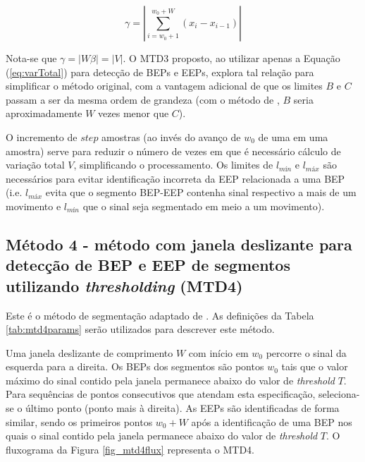 \begin{equation}
\label{eq:absVarTotal}
	\gamma = \left|\sum\limits_{i=w_0+1}^{w_0+W} (x_i - x_{i-1})\right|
\end{equation}

Nota-se que $\gamma = |W\beta| = |V|$. O MTD3 proposto, ao utilizar apenas a Equação (\ref{eq:varTotal}) para detecção de BEPs e EEPs, explora tal relação para simplificar o método original, com a vantagem adicional de que os limites $B$ e $C$ passam a ser da mesma ordem de grandeza (com o método de \cite{Gut2000}, $B$ seria aproximadamente $W$ vezes menor que $C$).

O incremento de $step$ amostras (ao invés do avanço de $w_0$ de uma em uma amostra) serve para reduzir o número de vezes em que é necessário cálculo de variação total $V$, simplificando o processamento. Os limites de $l_{mín}$ e $l_{máx}$ são necessários para evitar identificação incorreta da EEP relacionada a uma BEP (i.e. $l_{máx}$ evita que o segmento BEP-EEP contenha sinal respectivo a mais de um movimento e $l_{mín}$ que o sinal seja segmentado em meio a um movimento).

			\subsection{Método 4 - método com janela deslizante para detecção de BEP e EEP de segmentos utilizando \emph{thresholding} (MTD4)}
Este é o método de segmentação adaptado de \cite{Pattichis1995}. As definições da Tabela \ref{tab:mtd4params} serão utilizados para descrever este método.



Uma janela deslizante de comprimento $W$ com início em $w_0$ percorre o sinal da esquerda para a direita. Os BEPs dos segmentos são pontos $w_0$ tais que o valor máximo do sinal contido pela janela permanece abaixo do valor de \emph{threshold} $T$. Para sequências de pontos consecutivos que atendam esta especificação, seleciona-se o último ponto (ponto mais à direita). As EEPs são identificadas de forma similar, sendo os primeiros pontos $w_0 + W$ após a identificação de uma BEP nos quais o sinal contido pela janela permanece abaixo do valor de \emph{threshold} $T$. O fluxograma da Figura \ref{fig_mtd4flux} representa o MTD4.


